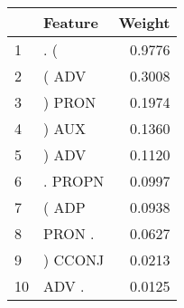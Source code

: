 \begin{tabular}{llr}
\toprule
{} &  Feature &  Weight \\
\midrule
1  &      . ( &  0.9776 \\
2  &    ( ADV &  0.3008 \\
3  &   ) PRON &  0.1974 \\
4  &    ) AUX &  0.1360 \\
5  &    ) ADV &  0.1120 \\
6  &  . PROPN &  0.0997 \\
7  &    ( ADP &  0.0938 \\
8  &   PRON . &  0.0627 \\
9  &  ) CCONJ &  0.0213 \\
10 &    ADV . &  0.0125 \\
\bottomrule
\end{tabular}
